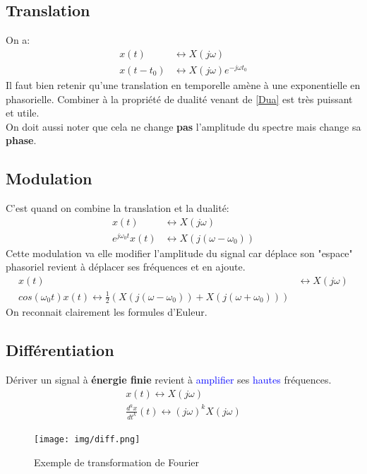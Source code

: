 \documentclass{report}
\begin{document}
\subsection{Translation}
On a:
\begin{align*}
x(t) & \longleftrightarrow X(j\omega)\\
x(t-t_0) & \longleftrightarrow X(j\omega)e^{-j \omega t_0}
\end{align*}
Il faut bien retenir qu'une translation en temporelle amène à une exponentielle en phasorielle. Combiner à la propriété de dualité venant de \ref{Dua} est très puissant et utile.\\
On doit aussi noter que cela ne change \textbf{pas} l'amplitude du spectre mais change sa \textbf{phase}.

\subsection{Modulation}
C'est quand on combine la translation et la dualité:
\begin{align*}
x(t) & \longleftrightarrow X(j\omega)\\
e^{j\omega_0 t}x(t) & \longleftrightarrow X(j(\omega - \omega_0))
\end{align*}
Cette modulation va elle modifier l'amplitude du signal car déplace son "espace" phasoriel revient à déplacer ses fréquences et en ajoute.
\begin{align*}
x(t) & \longleftrightarrow X(j\omega)\\
cos(\omega_0 t)x(t) \longleftrightarrow \frac{1}{2}(X(j(\omega - \omega_0)) + X(j(\omega + \omega_0))) 
\end{align*}
On reconnait clairement les formules d'Euleur.

\subsection{Différentiation}
Dériver un signal à \textbf{énergie finie} revient à \textcolor{blue}{amplifier} ses \textcolor{blue}{hautes} fréquences.
\begin{align*}
x(t) \longleftrightarrow X(j\omega)\\
\frac{d^kx}{dt^k}(t) \longleftrightarrow (j\omega)^kX(j\omega)
\end{align*}
\begin{figure}[H]
\centering
\texttt{[image: img/diff.png]}
\caption{Exemple de transformation de Fourier}
\end{figure}
\end{document}
